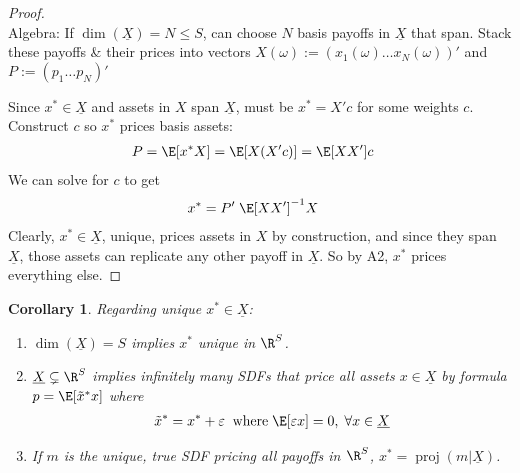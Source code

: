 \documentclass[12pt]{article}
\theoremstyle{plain}
\newtheorem{cor}[thm]{Corollary}
\theoremstyle{definition}
\theoremstyle{remark}
\newcommand{\proj}{\operatorname{proj}}
\begin{document}
\begin{multicols*}{2}
\begin{proof}
\\
Algebra: If $\dim(\underline{X})=N\leq S$, can choose $N$ basis payoffs
in $\underline{X}$ that span. Stack these payoffs \& their prices
into vectors
$X(\omega):=(x_1(\omega)\ldots x_N(\omega))'$ and
$P:=(p_1\ldots p_N)'$

Since $x^*\in\underline{X}$ and assets in $X$ span $\underline{X}$, must
be $x^*=X'c$ for some weights $c$. Construct $c$ so $x^*$ prices basis
assets:
\begin{align*}
  P &= \E[x^*X] = \E[X(X'c)] = \E[XX']c
\end{align*}
We can solve for $c$ to get
\begin{align*}
  x^* &= P'\;\E[XX']^{-1}X
\end{align*}
Clearly, $x^*\in\underline{X}$, unique, prices assets in $X$ by
construction, and since they span $\underline{X}$, those assets can
replicate any other payoff in $\underline{X}$. So by A2, $x^*$ prices
everything else.
\end{proof}


\begin{cor}
Regarding unique $x^*\in \underline{X}$:
\begin{enumerate}[label=\emph{(\roman*)}]
  \item $\dim(\underline{X})=S$ implies $x^*$ unique in $\R^S$.
  \item $\underline{X}\subsetneq \R^S$ implies infinitely many
    SDFs that price all assets $x\in\underline{X}$ by
    formula $p=\E[\tilde{x}^*x]$ where
    \begin{align*}
      \tilde{x}^*
      = x^* + \varepsilon
      \;\;
      \text{where}\;
      \E[\varepsilon x] = 0,
      \; \forall x\in\underline{X}
    \end{align*}
  \item If $m$ is the unique, true SDF pricing all payoffs in $\R^S$,
    $x^*=\proj(m|\underline{X})$.
\end{enumerate}
\end{cor}


\end{multicols*}
\end{document}
